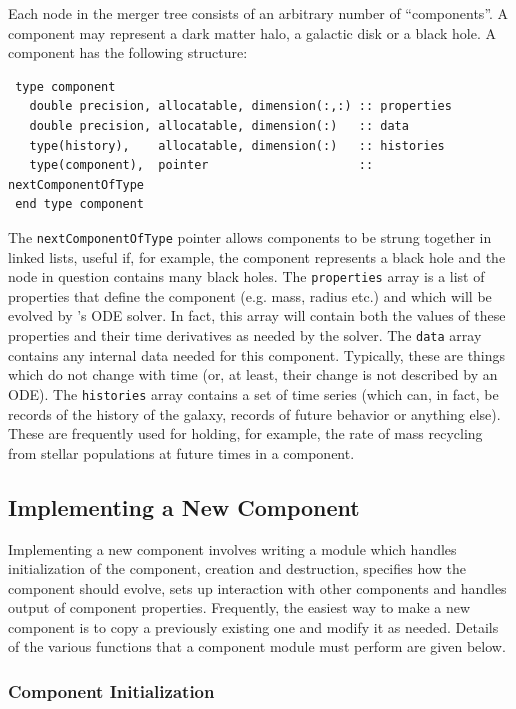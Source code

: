 Each node in the merger tree consists of an arbitrary number of ``components''. A component may represent a dark matter halo, a galactic disk or a black hole. A component has the following structure:
\begin{verbatim}
 type component
   double precision, allocatable, dimension(:,:) :: properties
   double precision, allocatable, dimension(:)   :: data
   type(history),    allocatable, dimension(:)   :: histories
   type(component),  pointer                     :: nextComponentOfType
 end type component
\end{verbatim}
The {\tt nextComponentOfType} pointer allows components to be strung together in linked lists, useful if, for example, the component represents a black hole and the node in question contains many black holes. The {\tt properties} array is a list of properties that define the component (e.g. mass, radius etc.) and which will be evolved by \glc's ODE solver. In fact, this array will contain both the values of these properties and their time derivatives as needed by the solver. The {\tt data} array contains any internal data needed for this component. Typically, these are things which do not change with time (or, at least, their change is not described by an ODE). The {\tt histories} array contains a set of time series (which can, in fact, be records of the history of the galaxy, records of future behavior or anything else). These are frequently used for holding, for example, the rate of mass recycling from stellar populations at future times in a component.

\subsection{Implementing a New Component}

Implementing a new component involves writing a module which handles initialization of the component, creation and destruction, specifies how the component should evolve, sets up interaction with other components and handles output of component properties. Frequently, the easiest way to make a new component is to copy a previously existing one and modify it as needed. Details of the various functions that a component module must perform are given below.

\subsubsection{Component Initialization}

